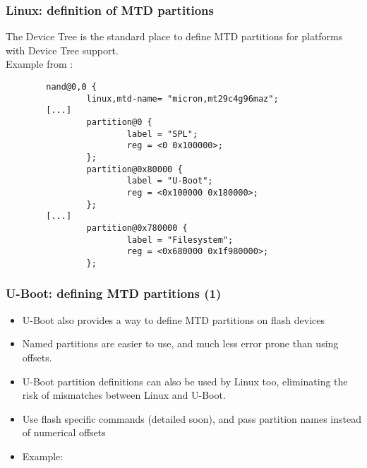 \begin{frame}[fragile]
  \frametitle{Linux: definition of MTD partitions}
  The Device Tree is the standard place to define MTD partitions
  for platforms with Device Tree support.\\
  Example from :
\begin{verbatim}
        nand@0,0 {
                linux,mtd-name= "micron,mt29c4g96maz";
		[...]
                partition@0 {
                        label = "SPL";
                        reg = <0 0x100000>;
                };
                partition@0x80000 {
                        label = "U-Boot";
                        reg = <0x100000 0x180000>;
                };
		[...]
                partition@0x780000 {
                        label = "Filesystem";
                        reg = <0x680000 0x1f980000>;
                };
\end{verbatim}
\end{frame}

\begin{frame}
  \frametitle{U-Boot: defining MTD partitions (1)}
  \begin{itemize}
  \item U-Boot also provides a way to define MTD partitions on flash devices
  \item Named partitions are easier to use, and much less error prone than using offsets.
  \item U-Boot partition definitions can also be used by Linux too,
    eliminating the risk of mismatches between Linux and U-Boot. 
  \item Use flash specific commands (detailed soon),
    and pass partition names instead of numerical offsets
  \item Example: 
  \end{itemize}
\end{frame}

